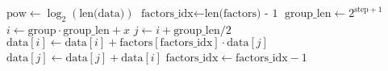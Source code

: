 \begin{algorithm}
    \begin{algorithmic}
            \State $\text{pow} \gets \log_2(\text{len(data)})$
            \State $\text{factors\_idx} \gets \text{len(factors) - 1}$
                \State $\text{group\_len} \gets 2^{\text{step} + 1}$
                        \State $i \gets \text{group} \cdot \text{group\_len} + x$
                        \State $j \gets i + \text{group\_len} / 2$
                        \State $\text{data}[i] \gets \text{data}[i] + \text{factors}[\text{factors\_idx}] \cdot \text{data}[j]$
                        \State $\text{data}[j] \gets \text{data}[j] + \text{data}[i]$
                    \EndFor
                    \State $\text{factors\_idx} \gets \text{factors\_idx} - 1$
                \EndFor
            \EndFor
        \EndFunction
    \end{algorithmic}
\end{algorithm}

